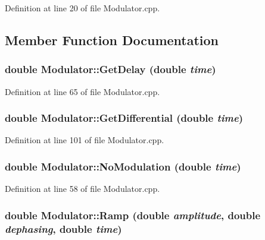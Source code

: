 Definition at line 20 of file Modulator.cpp.



\subsection{Member Function Documentation}
\hypertarget{classModulator_a10584ade4c8b9e10aaa78a8eed83261b}{
\subsubsection[{GetDelay}]{\setlength{\rightskip}{0pt plus 5cm}double Modulator::GetDelay (double {\em time})}}
\label{classModulator_a10584ade4c8b9e10aaa78a8eed83261b}


Definition at line 65 of file Modulator.cpp.

\hypertarget{classModulator_aed0bf37696c14ff9c4231993dfe306dd}{
\subsubsection[{GetDifferential}]{\setlength{\rightskip}{0pt plus 5cm}double Modulator::GetDifferential (double {\em time})}}
\label{classModulator_aed0bf37696c14ff9c4231993dfe306dd}


Definition at line 101 of file Modulator.cpp.

\hypertarget{classModulator_ae4aad8a94064186640f143bc2c0826ac}{
\subsubsection[{NoModulation}]{\setlength{\rightskip}{0pt plus 5cm}double Modulator::NoModulation (double {\em time})}}
\label{classModulator_ae4aad8a94064186640f143bc2c0826ac}


Definition at line 58 of file Modulator.cpp.

\hypertarget{classModulator_ab043a19a9057fec4a0b6199ad82bf20b}{
\subsubsection[{Ramp}]{\setlength{\rightskip}{0pt plus 5cm}double Modulator::Ramp (double {\em amplitude}, \/  double {\em dephasing}, \/  double {\em time})}}
\label{classModulator_ab043a19a9057fec4a0b6199ad82bf20b}


